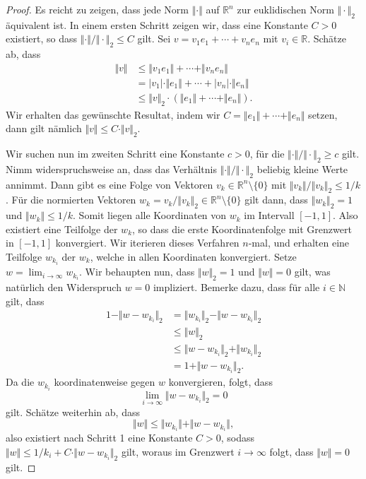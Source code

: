 \documentclass[../main.tex]{subfiles}
\begin{document}
\begin{proof}
  Es reicht zu zeigen, dass jede Norm
  $\Vert \cdot \Vert$ auf $\mathbb{R}^{n}$ 
  zur euklidischen Norm $\Vert \cdot \Vert_2$ 
  äquivalent ist.
  In einem ersten Schritt zeigen wir, dass
  eine Konstante $C > 0$ existiert, so dass
  $\Vert \cdot \Vert / \Vert \cdot \Vert_2 \leq C$
  gilt.
  Sei $v = v_1 e_1 +\cdots + v_n e_n$ mit $v_i \in \mathbb{R}$.
  Schätze ab, dass
  \begin{align*}
    \Vert v \Vert 
    &\leq \Vert v_1 e_1 \Vert + \cdots + \Vert v_n e_n \Vert \\
    &= |v_1| \cdot \Vert e_1 \Vert + \cdots + |v_n| \cdot \Vert e_n \Vert \\
    &\leq \Vert v \Vert_2 \cdot (\Vert e_1 \Vert + \cdots + \Vert e_n \Vert).
  \end{align*}
  Wir erhalten das gewünschte Resultat, indem wir
  $C = \Vert e_1 \Vert + \cdots + \Vert e_n \Vert$ setzen,
  dann gilt nämlich $\Vert v \Vert \leq C \cdot \Vert v \Vert_2$.

  Wir suchen nun im zweiten Schritt
  eine Konstante $c > 0$, für die $\Vert \cdot \Vert / \Vert \cdot \Vert_2
  \geq c$ gilt.
  Nimm widerspruchsweise an, dass das Verhältnis $\Vert \cdot \Vert /
  \Vert \cdot \Vert_2$ beliebig kleine Werte annimmt.
  Dann gibt es eine Folge von Vektoren
  $v_k \in \mathbb{R}^n \setminus \{0\}$ mit
  $\Vert v_k \Vert / \Vert v_k \Vert_2 \leq 1/k$.
  Für die normierten Vektoren $w_k = v_k / \Vert v_k \Vert_2
  \in \mathbb{R}^n \setminus \{0\}$ 
  gilt dann, dass $\Vert w_k \Vert_2 = 1$ 
  und $\Vert w_k \Vert \leq 1/k$.
  Somit liegen alle Koordinaten von $w_k$ 
  im Intervall $[-1, 1]$.
  Also existiert eine Teilfolge
  der $w_k$, so dass die erste Koordinatenfolge
  mit Grenzwert in $[-1, 1]$ konvergiert.
  Wir iterieren dieses Verfahren $n$-mal,
  und erhalten eine Teilfolge $w_{k_i}$ der $w_k$,
  welche in allen Koordinaten konvergiert.
  Setze $w = \lim_{i \to \infty} w_{k_i}$.
  Wir behaupten nun, dass $\Vert w \Vert_2 = 1$ 
  und $\Vert w \Vert = 0$ gilt, was
  natürlich den Widerspruch $w = 0$ impliziert.
  Bemerke dazu, dass für alle $i \in \mathbb{N}$ 
  gilt, dass
  \begin{align*}
     1 - \Vert w - w_{k_i} \Vert_2
     &= \Vert w_{k_i} \Vert_2 - \Vert w - w_{k_i} \Vert_2  \\
     &\leq \Vert w \Vert_2 \\ 
     &\leq \Vert w - w_{k_i} \Vert_2 + \Vert w_{k_i} \Vert_2 \\
    &= 1 + \Vert w - w_{k_i} \Vert_2.
  \end{align*}
  Da die $w_{k_i}$ koordinatenweise gegen $w$ konvergieren, folgt, dass
  \[
    \lim_{i \to \infty} \Vert w - w_{k_i}\Vert_2 = 0
  \]
  gilt. Schätze weiterhin ab, dass
  \[
     \Vert w \Vert
     \leq \Vert w_{k_i} \Vert + \Vert w - w_{k_i} \Vert ,
  \]
  also existiert nach Schritt 1 eine Konstante
  $C > 0$, sodass $\Vert w \Vert \leq 1/k_i + C \cdot
  \Vert w - w_{k_i} \Vert_2$
  gilt, woraus im Grenzwert $i \to \infty$ folgt,
  dass $\Vert w \Vert = 0$ gilt.
\end{proof}
\end{document}
